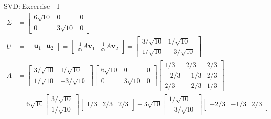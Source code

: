 \documentclass{beamer}
\begin{document}
\begin{frame}{SVD: Excercise - I}
{\begin{align*}
      \Sigma &= \begin{bmatrix}
                  6\sqrt{10} & 0          & 0 \\
                  0          & 3\sqrt{10} & 0
                \end{bmatrix} \\
      U &= \begin{bmatrix} \textbf{u}_1                 & \textbf{u}_2 \end{bmatrix}
         = \begin{bmatrix} \frac1{\sigma_1}A\textbf{v}_1 & \frac1{\sigma_2}A\textbf{v}_2 \end{bmatrix}
         = \begin{bmatrix}
           3/\sqrt{10} & 1/\sqrt{10} \\
           1/\sqrt{10} & -3/\sqrt{10}
           \end{bmatrix} \\
      A &= \begin{bmatrix}
           3/\sqrt{10} & 1/\sqrt{10} \\
           1/\sqrt{10} & -3/\sqrt{10}
           \end{bmatrix} 
           \begin{bmatrix}
             6\sqrt{10} & 0          & 0 \\
             0          & 3\sqrt{10} & 0
           \end{bmatrix}
           \begin{bmatrix}
           1/3  & 2/3  & 2/3 \\
           -2/3 & -1/3 & 2/3 \\
           2/3  & -2/3 & 1/3
           \end{bmatrix} \\
        &= 6\sqrt{10} \begin{bmatrix}
                      3/\sqrt{10}\\
                      1/\sqrt{10}
                      \end{bmatrix}
                      \begin{bmatrix} 1/3  & 2/3  & 2/3 \end{bmatrix}
           +
           3\sqrt{10} \begin{bmatrix}
                      1/\sqrt{10}\\
                      -3/\sqrt{10}
                      \end{bmatrix}
                      \begin{bmatrix} -2/3  & -1/3  & 2/3 \end{bmatrix}
    \end{align*}
  }%
\end{frame}
\end{document}
